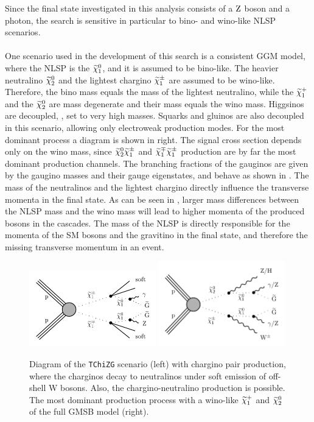 Since the final state investigated in this analysis consists of a $\mathrm{Z}$ boson and a photon, the search is sensitive in particular to bino- and wino-like NLSP scenarios.\\\\
One scenario used in the development of this search is a consistent GGM model, where the NLSP is the $\widetilde{\chi}^{0}_{1}$, and it is assumed to be bino-like. The heavier neutralino $\widetilde{\chi}^{0}_{2}$ and the lightest chargino $\widetilde{\chi}^\pm_{1}$ are assumed to be wino-like. Therefore, the bino mass equals the mass of the lightest neutralino, while the $\widetilde{\chi}^{+}_{1}$ and the $\widetilde{\chi}^{0}_{2}$ are mass degenerate and their mass equals the wino mass. Higgsinos are decoupled, \ie, set to very high masses. Squarks and gluinos are also decoupled in this scenario, allowing only electroweak production modes. For the most dominant process a diagram is shown in  right. The signal cross section depends only on the wino mass, since $\widetilde{\chi}^{0}_{2}\widetilde{\chi}^\pm_{1}$ and $\widetilde{\chi}^\mp_{1}\widetilde{\chi}^\pm_{1}$ production are by far the most dominant production channels. The branching fractions of the gauginos are given by the gaugino masses and their gauge eigenstates, and behave as shown in . The mass of the neutralinos and the lightest chargino directly influence the transverse momenta in the final state. As can be seen in , larger mass differences between the NLSP mass and the wino mass will lead to higher momenta of the produced bosons in the cascades. The mass of the NLSP is directly responsible for the momenta of the SM bosons and the gravitino in the final state, and therefore the missing transverse momentum in an event.
\begin{figure}[tbp]
 \centering
 \includegraphics[width=0.49\textwidth]{figures/signal/TChiNG}
 \includegraphics[width=0.49\textwidth]{figures/signal/gmsb}
 \caption{Diagram of the \texttt{TChiZG} scenario (left) with chargino pair production, where the charginos decay to neutralinos under soft emission of off-shell W bosons. Also, the chargino-neutralino production is possible. The most dominant production process with a wino-like $\widetilde{\chi}^{+}_{1}$ and $\widetilde{\chi}^{0}_{2}$ of the full GMSB model (right).}
 \label{fig:ewkSMS}
\end{figure}
